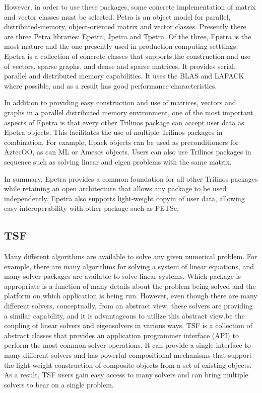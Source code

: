 \documentclass[12pt,strict]{TrilinosDevGuide}
\begin{document}
However, in order to use these packages, some concrete
implementation of matrix and vector classes must be selected.  
Petra is an object model for parallel,
distributed-memory, object-oriented matrix and vector classes.
Presently there are three Petra libraries: Epetra, Jpetra and Tpetra.
Of the three, Epetra is the most mature and the one presently used in
production computing setttings.  Epetra is a collection of concrete
classes that supports the construction and use of vectors, sparse
graphs, and dense and sparse matrices.  It provides serial, parallel and
distributed memory
capabilities.  It uses the BLAS and LAPACK where possible, and as a
result has good performance characteristics.

In addition to providing easy construction and use of matrices,
vectors and graphs in a parallel distributed memory environment,
one of the most important aspects of Epetra is that every other
Trilinos package can accept user data as Epetra objects.  This
facilitates the use of multiple Trilinos packages in combination.  For
example, Ifpack objects can be used as preconditioners for AztecOO, as
can ML or Amesos objects.  Users can also use Trilinos packages in
sequence such as solving linear and eigen problems with the same
matrix.

In summary, Epetra provides a common foundation for all other Trilinos
packages while retaining an open architecture that allows any package
to be used independently.  Epetra also supports light-weight copyin of
user data, allowing easy interoperability with other package such as
PETSc.

\subsection{TSF}
\label{subsect:InteropTSF}
Many different algorithms are available to solve any given numerical
problem.  For example, there are many algorithms for solving a system
of linear equations, and many solver packages are available to solve
linear systems.  Which package is appropriate is a function of
many details about the problem being solved and the platform on which
application is being run. However, even though
there are many different solvers, conceptually, from an abstract view,
these solvers are providing a similar capability, and it is
advantageous to utilize this abstract view.be the coupling of
linear solvers and eigensolvers in various ways.
TSF is a collection of abstract classes that provides an application
programmer interface (API) to perform the most common solver
operations.  It can provide a single interface to many different
solvers and has powerful compositional mechanisms that support the
light-weight construction of composite objects from a set of
existing objects.  As a result, TSF users gain easy access to many
solvers and can bring multiple solvers to bear on a single problem.
\end{document}
